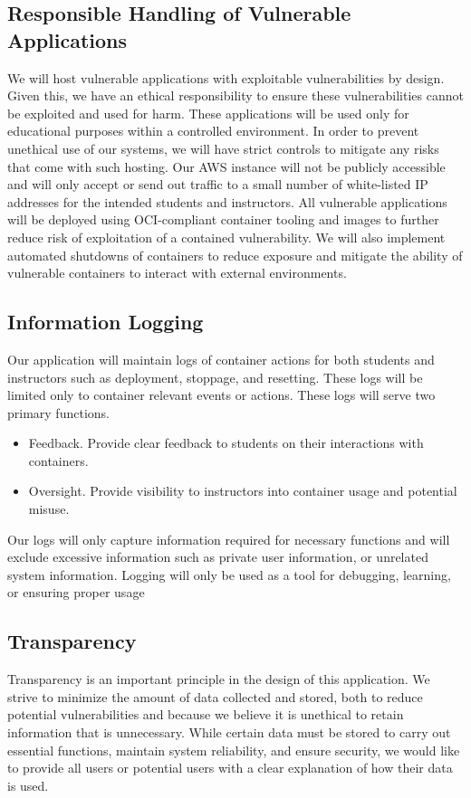 \documentclass[12pt,titlepage]{article}
\begin{document}
\subsection{Responsible Handling of Vulnerable Applications}
We will host vulnerable applications with exploitable vulnerabilities by design. Given this, we have an ethical responsibility to ensure these vulnerabilities cannot be exploited and used for harm. These applications will be used only for educational purposes within a controlled environment. In order to prevent unethical use of our systems, we will have strict controls to mitigate any risks that come with such hosting. Our AWS instance will not be publicly accessible and will only accept or send out traffic to a small number of white-listed IP addresses for the intended students and instructors. All vulnerable applications will be deployed using OCI-compliant container tooling and images to further reduce risk of exploitation of a contained vulnerability. We will also implement automated shutdowns of containers to reduce exposure and mitigate the ability of vulnerable containers to interact with external environments.


\subsection{Information Logging}
Our application will maintain logs of container actions for both students and instructors such as deployment, stoppage, and resetting. These logs will be limited only to container relevant events or actions. These logs will serve two primary functions.
\begin{itemize}
	\item Feedback. Provide clear feedback to students on their interactions with containers.
	\item Oversight. Provide visibility to instructors into container usage and potential misuse.
\end{itemize}

Our logs will only capture information required for necessary functions and will exclude excessive information such as private user information, or unrelated system information. Logging will only be used as a tool for debugging, learning, or ensuring proper usage

\subsection{Transparency}
Transparency is an important principle in the design of this application. We strive to minimize the amount of data collected and stored, both to reduce potential vulnerabilities and because we believe it is unethical to retain information that is unnecessary. While certain data must be stored to carry out essential functions, maintain system reliability, and ensure security, we would like to provide all users or potential users with a clear explanation of how their data is used.
\end{document}
